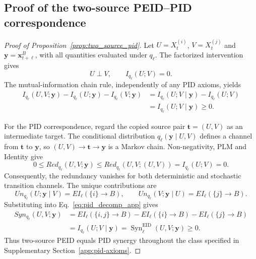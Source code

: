 \subsection{Proof of the two-source PEID--PID correspondence}
\label{app:proof_two_source_pid}
\begin{proof}[Proof of Proposition~\ref{prop:two_source_pid}]
Let $U=X_t^{(i)}$, $V=X_t^{(j)}$ and $\boldsymbol{y}=\boldsymbol{x}_{t+\ell}^{B}$, with all quantities evaluated under $q_\ell$. The factorized intervention gives
\begin{equation}
U\perp V,\qquad I_{q_\ell}(U;V)=0.
\label{eq:supp_source_independence}
\end{equation}
The mutual-information chain rule, independently of any PID axioms, yields
\begin{align}
I_{q_\ell}(U,V;\boldsymbol{y})-I_{q_\ell}(U;\boldsymbol{y})-I_{q_\ell}(V;\boldsymbol{y})
&=I_{q_\ell}(U;V\mid\boldsymbol{y})-I_{q_\ell}(U;V)\nonumber\\
&=I_{q_\ell}(U;V\mid\boldsymbol{y})\geq0.
\label{eq:supp_two_source_cmi_identity}
\end{align}

For the PID correspondence, regard the copied source pair $\boldsymbol{t}=(U,V)$ as an intermediate target. The conditional distribution $q_\ell(\boldsymbol{y}\mid U,V)$ defines a channel from $\boldsymbol{t}$ to $\boldsymbol{y}$, so $(U,V)\rightarrow\boldsymbol{t}\rightarrow\boldsymbol{y}$ is a Markov chain. Non-negativity, PLM and Identity give
\begin{equation}
0\leq Red_{q_\ell}(U,V;\boldsymbol{y})
\leq Red_{q_\ell}(U,V;(U,V))
=I_{q_\ell}(U;V)=0.
\label{eq:supp_redundancy_zero}
\end{equation}
Consequently, the redundancy vanishes for both deterministic and stochastic transition channels. The unique contributions are
\begin{equation}
Un_{q_\ell}(U;\boldsymbol{y}\mid V)=EI_\ell(\{i\}\rightarrow B),
\qquad
Un_{q_\ell}(V;\boldsymbol{y}\mid U)=EI_\ell(\{j\}\rightarrow B).
\label{eq:supp_unique_information}
\end{equation}
Substituting into Eq.~\eqref{eq:pid_decomp_app} gives
\begin{align}
Syn_{q_\ell}(U,V;\boldsymbol{y})
&=EI_\ell(\{i,j\}\rightarrow B)-EI_\ell(\{i\}\rightarrow B)-EI_\ell(\{j\}\rightarrow B)\nonumber\\
&=I_{q_\ell}(U;V\mid\boldsymbol{y})
=\operatorname{Syn}^{\mathrm{EID}}_\ell(U,V;\boldsymbol{y})\geq0.
\label{eq:supp_two_source_synergy}
\end{align}
Thus two-source PEID equals PID synergy throughout the class specified in Supplementary Section~\ref{app:pid-axioms}.
\end{proof}


